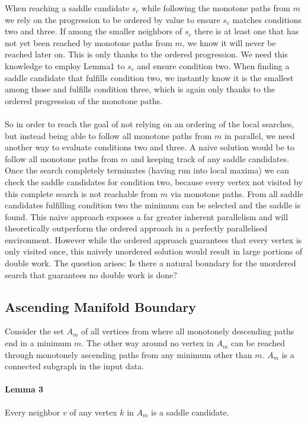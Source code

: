 \documentclass{scrartcl}
\begin{document}
When reaching a saddle candidate \(s_c\) while following the monotone paths from \(m\) we rely on the progression to be ordered by value to ensure \(s_c\) matches conditions two and three. If among the smaller neighbors of \(s_c\) there is at least one that has not yet been reached by monotone paths from \(m\), we know it will never be reached later on. This is only thanks to the ordered progression. We need this knowledge to employ Lemma1 to \(s_c\) and ensure condition two. When finding a saddle candidate that fulfills condition two, we instantly know it is the smallest among those and fulfills condition three, which is again only thanks to the ordered progression of the monotone paths.

\paragraph{}
So in order to reach the goal of not relying on an ordering of the local searches, but instead being able to follow all monotone paths from \(m\) in parallel, we need another way to evaluate conditions two and three. A naive solution would be to follow all monotone paths from \(m\) and keeping track of any saddle candidates. Once the search completely terminates (having run into local maxima) we can check the saddle candidates for condition two, because every vertex not visited by this complete search is not reachable from \(m\) via monotone paths. From all saddle candidates fulfilling condition two the minimum can be selected and the saddle is found. This naive approach exposes a far greater inherent parallelism and will theoretically outperform the ordered approach in a perfectly parallelised environment. However while the ordered approach guarantees that every vertex is only visited once, this naively unordered solution would result in large portions of double work. The question arises: Is there a natural boundary for the unordered search that guarantees no double work is done?

\subsection{Ascending Manifold Boundary} \label{ssec:num1}
Consider the set \(A_m\) of all vertices from where all monotonely descending paths end in a minimum \(m\). The other way around no vertex in \(A_m\) can be reached through monotonely ascending paths from any minimum other than \(m\). \(A_m\) is a connected subgraph in the input data. 

\paragraph{Lemma 3} Every neighbor \(v\) of any vertex \(k\) in \(A_m\) is a saddle candidate.
\end{document}
